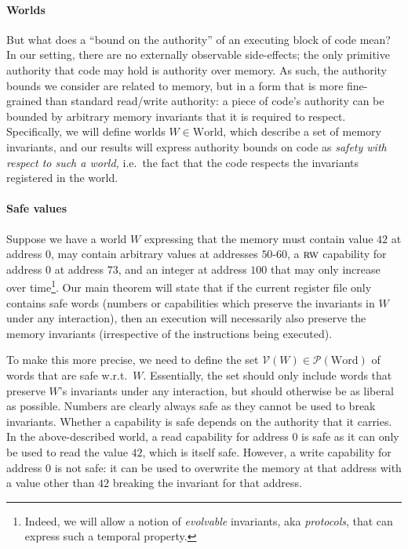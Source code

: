 \documentclass[format=acmsmall, review=true, screen=true]{acmart}
\newcommand{\powerset}[1]{\mathcal{P}(#1)}
\newcommand{\asmType}{\plaindom{AsmType}}
\newcommand{\plaindom}[1]{\mathrm{#1}}
\newcommand{\Words}{\plaindom{Word}}
\newcommand{\Worlds}{\plaindom{World}}
\newcommand{\intr}[2]{\mathcal{#1}}
\newcommand{\valueintr}[1]{\intr{V}{#1}}
\newcommand{\stdvr}{\valueintr{\asmType}}
\newcommand{\plainperm}[1]{\textsc{#1}}
\newcommand{\readwrite}{\plainperm{rw}}
\newenvironment{toplas}%
    {\color{OliveGreen}}{}
\begin{document}
\begin{toplas}
\paragraph{Worlds}
But what does a ``bound on the authority'' of an executing block of code mean?
In our setting, there are no externally observable side-effects; the only
primitive authority that code may hold is authority over memory. As such, the
authority bounds we consider are related to memory, but in a form that is more
fine-grained than standard read/write authority: a piece of code's authority can be bounded
by arbitrary memory invariants that it is required to respect. Specifically, we
will define worlds $W \in \Worlds$, which describe a set of memory invariants, and
our results will express authority bounds on code as \emph{safety with respect to such
a world,} i.e.\ the fact that the code respects the invariants registered in
the world.

\paragraph{Safe values}
Suppose we have a world $W$ expressing that the memory must contain
value $42$ at address $0$, may contain arbitrary values at
addresses $50$-$60$, a $\readwrite$ capability for address $0$ at address $73$, and
an integer at address $100$ that may only increase over time\footnote{Indeed, we
  will allow a notion of \emph{evolvable} invariants, aka \emph{protocols}, that can
  express such a temporal property.}. Our main theorem will state that if the
current register file only contains safe words (numbers or capabilities which
preserve the invariants in $W$ under any interaction), then an execution will
necessarily also preserve the memory invariants (irrespective of the instructions being
executed).

To make this more precise, we need to define the set $\stdvr(W) \in
\powerset{\Words}$ of words that are safe w.r.t.\ $W$. Essentially, the set
should only include words that preserve $W$'s invariants under any interaction,
but should otherwise be as liberal as possible. Numbers are clearly always safe
as they cannot be used to break invariants. Whether a capability is safe depends
on the authority that it carries. In the above-described world, a read capability
for address $0$ is safe as it can only be used to read the value $42$, which is
itself safe. However, a write capability for address $0$ is not safe: it can be
used to overwrite the memory at that address with a value other than $42$
breaking the invariant for that address.


\end{toplas}
\end{document}
